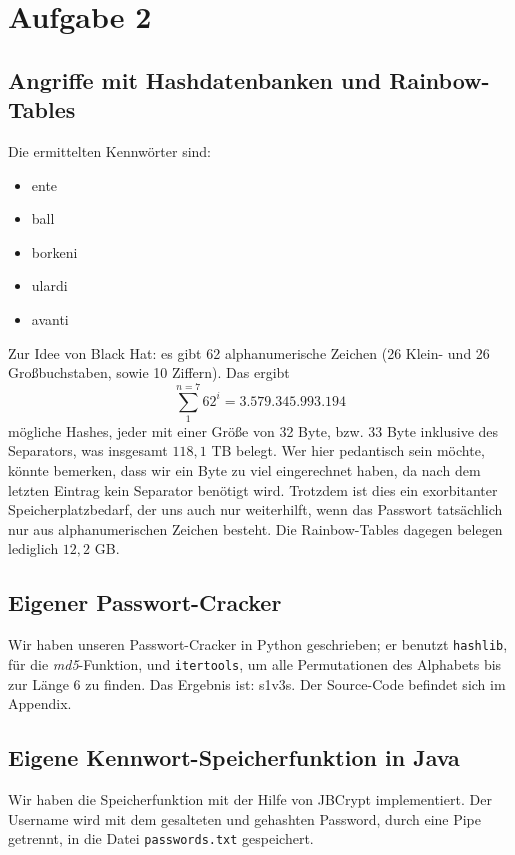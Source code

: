 \documentclass[10pt,a4paper]{article}
\begin{document}
\setcounter{section}{2}
\setcounter{subsection}{0}
\section*{Aufgabe 2}
\subsection{Angriffe mit Hashdatenbanken und Rainbow-Tables}
Die ermittelten Kennwörter sind:
\begin{itemize}
\item ente
\item ball
\item borkeni
\item ulardi
\item avanti
\end{itemize}
Zur Idee von Black Hat:
es gibt 62 alphanumerische Zeichen (26 Klein- und 26 Großbuchstaben, sowie 10 Ziffern).
Das ergibt $$ \sum_1^{n=7} 62^i = 3.579.345.993.194 $$ mögliche Hashes, jeder mit einer
Größe von 32 Byte, bzw. 33 Byte inklusive des Separators, was insgesamt $118,1$ TB belegt.
Wer hier pedantisch sein möchte, könnte bemerken, dass wir ein Byte zu viel eingerechnet
haben, da nach dem letzten Eintrag kein Separator benötigt wird. Trotzdem ist dies ein
exorbitanter Speicherplatzbedarf, der uns auch nur weiterhilft, wenn das Passwort
tatsächlich nur aus alphanumerischen Zeichen besteht. Die Rainbow-Tables dagegen belegen
lediglich $12,2$ GB.

\subsection{Eigener Passwort-Cracker}
Wir haben unseren Passwort-Cracker in Python geschrieben; er benutzt \texttt{hashlib},
für die \textit{md5}-Funktion, und \texttt{itertools}, um alle Permutationen
des Alphabets bis zur Länge 6 zu finden.
Das Ergebnis ist: s1v3s.
Der Source-Code befindet sich im Appendix.

\subsection{Eigene Kennwort-Speicherfunktion in Java}

Wir haben die Speicherfunktion mit der Hilfe von JBCrypt implementiert. Der Username wird mit dem gesalteten und gehashten Password, durch eine Pipe getrennt, in die Datei \texttt{passwords.txt} gespeichert. 
\end{document}

